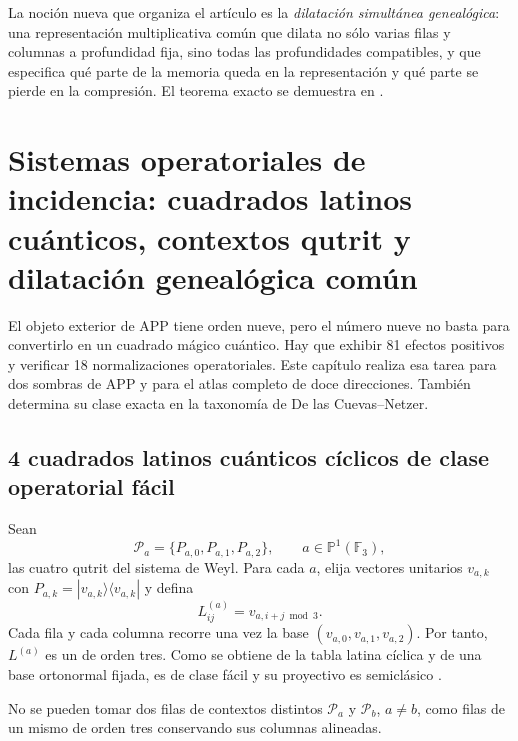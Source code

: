 \begin{bridgebox}
La noción nueva que organiza el artículo es la \emph{dilatación simultánea
genealógica}: una representación multiplicativa común que dilata no sólo varias
filas y columnas a profundidad fija, sino todas las profundidades compatibles,
y que especifica qué parte de la memoria queda en la representación y qué
parte se pierde en la compresión. El teorema exacto se demuestra en
.
\end{bridgebox}


\section[Sistemas operatoriales de incidencia]{Sistemas operatoriales de
incidencia: cuadrados latinos cuánticos, contextos qutrit y dilatación
genealógica común}
\label{p12-83-c22-s3:gmc:chap:qms}

El objeto exterior de APP tiene orden nueve, pero el número nueve no basta
para convertirlo en un cuadrado mágico cuántico. Hay que exhibir 81 efectos
positivos y verificar 18 normalizaciones operatoriales. Este capítulo realiza
esa tarea para dos sombras de APP y para el atlas completo de doce
direcciones. También determina su clase exacta en la taxonomía de De las
Cuevas--Netzer.

\subsection{4 cuadrados latinos cuánticos cíclicos de clase operatorial fácil}

Sean
\[
 \mathcal P_a=\{P_{a,0},P_{a,1},P_{a,2}\},
 \qquad a\in\mathbb P^1(\mathbb F_3),
 \tag{GMC-4.1}
\]
las cuatro \PVM qutrit del sistema de Weyl. Para cada $a$, elija vectores
unitarios $v_{a,k}$ con
$P_{a,k}=|v_{a,k}\rangle\langle v_{a,k}|$ y defina
\[
 L^{(a)}_{ij}=v_{a,i+j\bmod3}.
 \tag{GMC-4.2}
\]
Cada fila y cada columna recorre una vez la base
$(v_{a,0},v_{a,1},v_{a,2})$. Por tanto, $L^{(a)}$ es un \QLS de orden tres.
Como se obtiene de la tabla latina cíclica y de una base ortonormal fijada, es de clase fácil y su
\QMS proyectivo es semiclásico
\citep{delascuevas2023latin}.

\begin{proposition}
\label{p12-83-c22-s3:gmc:prop:no-go-mub}
No se pueden tomar dos filas de contextos distintos
$\mathcal P_a$ y $\mathcal P_b$, $a\ne b$, como filas de un mismo \QLS de
orden tres conservando sus columnas alineadas.
\end{proposition}

